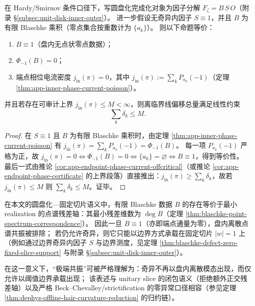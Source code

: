 \begin{corollary}\label{cor:xi-extreme-resonance-criterion}
在 Hardy/Smirnov 条件口径下，写圆盘化完成化对象为因子分解 \(F_{\zeta}=B\,S\,O\)（附录 \S\ref{subsec:unit-disk-inner-outer}）。
进一步假设无奇异内因子 \(S\equiv 1\)，并且 \(B\) 为有限 Blaschke 乘积（零点集合按重数计为 \(\{a_k\}\)）。
则以下命题等价：
\begin{enumerate}
  \item \(B\equiv 1\)（盘内无点状零点数据）；
  \item \(\Phi_{-1}(B)=0\)；
  \item 端点相位电流密度 \(j_{\mathrm{in}}(\pi)=0\)，其中 \(j_{\mathrm{in}}(\pi):=\sum_k P_{a_k}(-1)\)（定理 \ref{thm:app-inner-phase-current-poisson}）。
\end{enumerate}
并且若存在可审计上界 \(j_{\mathrm{in}}(\pi)\le M<\infty\)，则离临界线偏移总量满足线性约束
\[
\sum_k\delta_k\le M.
\]
\end{corollary}

\begin{proof}
在 \(S\equiv 1\) 且 \(B\) 为有限 Blaschke 乘积时，由定理 \ref{thm:app-inner-phase-current-poisson} 有
\(
j_{\mathrm{in}}(\pi)=\sum_k P_{a_k}(-1)=\Phi_{-1}(B)
\)。
每一项 \(P_{a_k}(-1)\) 严格为正，故
\(
j_{\mathrm{in}}(\pi)=0
\iff
\Phi_{-1}(B)=0
\iff
\{a_k\}=\varnothing
\iff
B\equiv 1
\)，得到等价性。
最后一式由推论 \ref{cor:app-endpoint-phase-current-offcritical}（或推论 \ref{cor:app-endpoint-phase-certificate} 的上界段落）直接推出：\(j_{\mathrm{in}}(\pi)\ge \sum_k\delta_k\)，故若 \(j_{\mathrm{in}}(\pi)\le M\) 则 \(\sum_k\delta_k\le M\)。证毕。
\end{proof}

\begin{remark}\label{rem:xi-threshold-carrying-extreme-resonance}
在本文的圆盘化—固定切片语义中，有限 Blaschke 数据 \(B\) 的存在等价于最小 realization 的点谱残差轴：其最小残差维数为 \(\deg B\)（定理 \ref{thm:blaschke-point-spectrum-correspondence}）。
因此一旦 \(B\equiv 1\)（亦即端点通量为零），盘内离散点谱共振被排除；
若仍允许奇异，则它只能以边界方式承载在固定切片 \(|w|=1\) 上（例如通过边界奇异内因子 \(S\) 与边界测度，见定理 \ref{thm:blaschke-defect-zero-fixed-slice-support} 与附录 \S\ref{subsec:unit-disk-inner-outer}）。
\par
在这一意义下，“极端共振”可被严格理解为：奇异不再以盘内离散模态出现，而仅允许以阈值边界承载出现；
该表述与 unitary slice 的闭包语义（拒绝额外正交残差轴）以及严格 Beck--Chevalley/strictification 的零异常口径相容（参见定理 \ref{thm:dephys-offline-hair-curvature-reduction} 的归约链）。
\end{remark}

